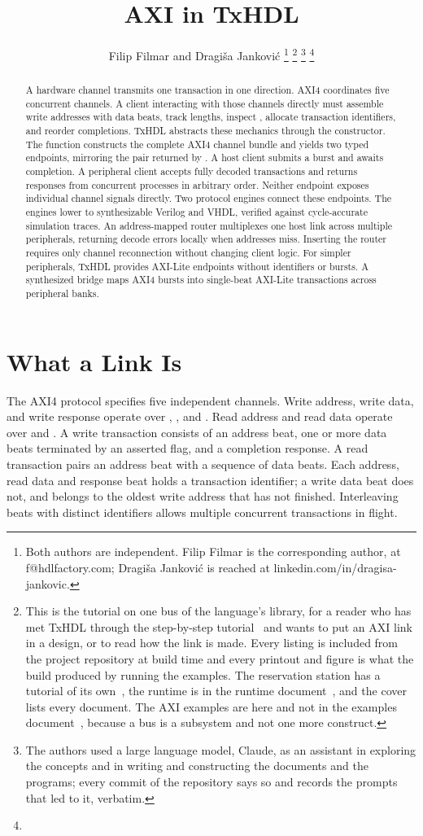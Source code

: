 \documentclass[journal,9pt]{IEEEtran}
\title{AXI in TxHDL}
\author{Filip Filmar and Dragiša Janković%
\thanks{Both authors are independent. Filip Filmar is the
corresponding author, at f@hdlfactory.com; Dragiša Janković is
reached at linkedin.com/in/dragisa-jankovic.}%
\thanks{This is the tutorial on one bus of the language's library,
for a reader who has met TxHDL through the step-by-step
tutorial~\cite{tutorial} and wants to put an AXI link in a design,
or to read how the link is made. Every listing is included from the
project repository \code{HDL/txhdl} at build time and every printout
and figure is what the build produced by running the examples. The
reservation station has a tutorial of its own~\cite{station}, the
runtime is in the runtime document~\cite{runtime}, and the
cover~\cite{cover} lists every document. The AXI examples are here
and not in the examples document~\cite{examples}, because a bus is a
subsystem and not one more construct.}%
\thanks{The authors used a large language model, Claude, as an
assistant in exploring the concepts and in writing and constructing
the documents and the programs; every commit of the repository says
so and records the prompts that led to it, verbatim.}%
\thanks{\buildstamp}}
\begin{document}
\maketitle

\begin{abstract}
A hardware channel transmits one transaction in one direction. AXI4
coordinates five concurrent channels. A client interacting with those
channels directly must assemble write addresses with data beats, track
lengths, inspect , allocate transaction identifiers, and reorder
completions. TxHDL abstracts these mechanics through the 
constructor. The function constructs the complete AXI4 channel bundle and
yields two typed endpoints, mirroring the pair returned by . A
host client submits a burst and awaits completion. A peripheral client
accepts fully decoded transactions and returns responses from concurrent
processes in arbitrary order. Neither endpoint exposes individual channel
signals directly. Two protocol engines connect these endpoints. The engines
lower to synthesizable Verilog and VHDL, verified against cycle-accurate
simulation traces. An address-mapped router multiplexes one host link
across multiple peripherals, returning decode errors locally when addresses
miss. Inserting the router requires only channel reconnection without
changing client logic. For simpler peripherals, TxHDL provides AXI-Lite
endpoints without identifiers or bursts. A synthesized bridge maps AXI4
bursts into single-beat AXI-Lite transactions across peripheral banks.
\end{abstract}

\section{What a Link Is}
\label{sec:a-what}

The AXI4 protocol specifies five independent channels. Write address,
write data, and write response operate over , , and
. Read address and read data operate over  and . A
write transaction consists of an address beat, one or more data beats
terminated by an asserted  flag, and a completion response. A
read transaction pairs an address beat with a sequence of data beats.
Each address, read data and response beat holds a transaction identifier;
a write data beat does not, and belongs to the oldest write address that
has not finished. Interleaving beats with distinct
identifiers allows multiple concurrent transactions in flight.
\end{document}
